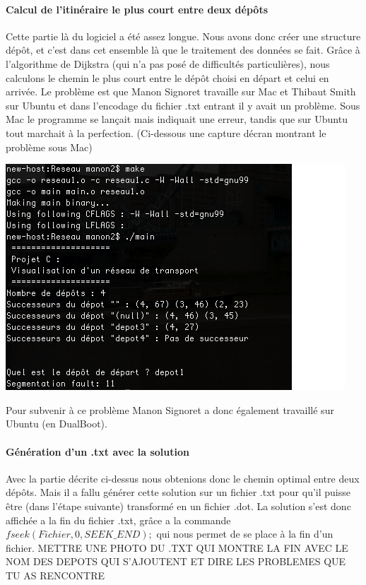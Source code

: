 \documentclass[12pt,a4paper]{report}
\begin{document}
\paragraph{Calcul de l'itinéraire le plus court entre deux dépôts}
Cette partie là du logiciel a été assez longue. Nous avons donc créer une structure dépôt, et c'est dans cet ensemble là que le traitement des données se fait. Grâce à l'algorithme de Dijkstra (qui n'a pas posé de difficultés particulières), nous calculons le chemin le plus court entre le dépôt choisi en départ et celui en arrivée. Le problème est que Manon Signoret travaille sur Mac et Thibaut Smith sur Ubuntu et dans l'encodage du fichier .txt entrant il y avait un problème. Sous Mac le programme se lançait mais indiquait une erreur, tandis que sur Ubuntu tout marchait à la perfection. (Ci-dessous une capture décran montrant le problème sous Mac)
\begin{center}
\includegraphics[scale=0.6]{capture1.png}
\end{center}
Pour subvenir à ce problème Manon Signoret a donc également travaillé sur Ubuntu (en DualBoot).

\paragraph{Génération d'un .txt avec la solution}
Avec la partie décrite ci-dessus nous obtenions donc le chemin optimal entre deux dépôts. Mais il a fallu générer cette solution sur un fichier .txt pour qu'il puisse être (dans l'étape suivante) transformé en un fichier .dot. La solution s'est donc affichée a la fin du fichier .txt, grâce a la commande \textit{$fseek(Fichier, 0, SEEK\_END);$} qui nous permet de se place à la fin d'un fichier. METTRE UNE PHOTO DU .TXT QUI MONTRE LA FIN AVEC LE NOM DES DEPOTS QUI S'AJOUTENT ET DIRE LES PROBLEMES QUE TU AS RENCONTRE
\end{document}

